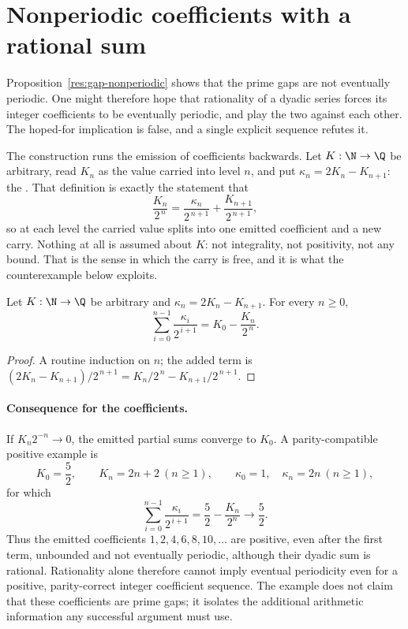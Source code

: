 \documentclass[11pt]{article}
\begin{document}
\section{Nonperiodic coefficients with a rational sum}\label{sec:carry}

Proposition~\ref{res:gap-nonperiodic} shows that the prime gaps are not
eventually periodic.  One might therefore hope that rationality of a dyadic
series forces its integer coefficients to be eventually periodic, and play the
two against each other.  The hoped-for implication is false, and a single
explicit sequence refutes it.

The construction runs the emission of coefficients backwards.  Let
$K:\N\to\Q$ be arbitrary, read $K_n$ as the value carried into level $n$, and
put $\kappa_n=2K_n-K_{n+1}$: the
.
That definition is exactly the statement that
\[
 \frac{K_n}{2^{\,n}}
 =\frac{\kappa_n}{2^{\,n+1}}+\frac{K_{n+1}}{2^{\,n+1}} ,
\]
so at each level the carried value splits into one emitted coefficient and a
new carry.  Nothing at all is assumed about $K$: not integrality, not
positivity, not any bound.  That is the sense in which the carry is free, and
it is what the counterexample below exploits.

\begin{proposition}\label{res:telescope}
Let $K:\N\to\Q$ be arbitrary and $\kappa_n=2K_n-K_{n+1}$.  For every $n\ge0$,
\[
 \sum_{i=0}^{n-1}\frac{\kappa_i}{2^{\,i+1}}=K_0-\frac{K_n}{2^{\,n}} .
\]
\end{proposition}

\begin{proof}
A routine induction on $n$; the added term is
$(2K_n-K_{n+1})/2^{\,n+1}=K_n/2^{\,n}-K_{n+1}/2^{\,n+1}$.
\end{proof}

\paragraph{Consequence for the coefficients.}
If $K_n2^{-n}\to0$, the emitted partial sums converge to $K_0$.  A
parity-compatible positive example is
\[
 K_0=\frac52,\qquad K_n=2n+2\ (n\ge1),\qquad
 \kappa_0=1,\quad\kappa_n=2n\ (n\ge1),
\]
for which
\[
 \sum_{i=0}^{n-1}\frac{\kappa_i}{2^{\,i+1}}
   =\frac52-\frac{K_n}{2^n}\longrightarrow\frac52.
\]
Thus the emitted coefficients $1,2,4,6,8,10,\ldots$ are positive, even after
the first term, unbounded and not eventually periodic, although their dyadic
sum is rational.  Rationality alone therefore cannot imply eventual
periodicity even for a positive, parity-correct integer coefficient sequence.
The example does not claim that these coefficients are prime gaps; it isolates
the additional arithmetic information any successful argument must use.
\end{document}
